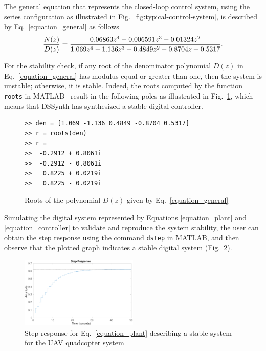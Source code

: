 \documentclass[10pt,conference]{IEEEtran}
\begin{document}
The general equation that represents the closed-loop control system, using
the series configuration as illustrated in
Fig.~\ref{fig:typical-control-system}, is described by
Eq.~\ref{equation_general} as follows
%
\begin{equation}
\small
\label{equation_general}
\frac{N(z)}{D(z)}=\frac{0.06863z^{4} - 0.006591z^{3} - 0.01324z^{2}}{1.069z^{4} - 1.136z^{3} + 0.4849z^{2} -0.8704z + 0.5317}.
\end{equation}
 
For the stability check, if any root of the denominator polynomial $D(z)$ in
Eq.~\ref{equation_general} has modulus equal or greater than one, then the
system is unstable; otherwise, it is stable.  Indeed, the roots computed by
the function \texttt{roots} in MATLAB~\cite{matlab-toolbox} result in the
following poles as illustrated in Fig.~\ref{roots-of-dz}, which means that
DSSynth has synthesized a stable digital controller.

\begin{figure}[ht]
\scriptsize
\begin{lstlisting}[xleftmargin=.025\textwidth,xrightmargin=.025\textwidth, frame=single, basicstyle=\tt]
>> den = [1.069 -1.136 0.4849 -0.8704 0.5317]
>> r = roots(den)
>> r =
>>  -0.2912 + 0.8061i
>>  -0.2912 - 0.8061i
>>   0.8225 + 0.0219i
>>   0.8225 - 0.0219i
\end{lstlisting}
\vspace{-0.2cm}
\caption{Roots of the polynomial $D(z)$ given by Eq.~\ref{equation_general}}
\label{roots-of-dz}
\end{figure}

Simulating the digital system represented by Equations
\eqref{equation_plant} and \eqref{equation_controller} to validate and
reproduce the system stability, the user can obtain the step response using
the command \texttt{dstep} in MATLAB, and then observe that the plotted
graph indicates a stable digital system (Fig.~\ref{step-response}).

\begin{figure}[ht]
  \includegraphics[width=0.5\textwidth]{step-response.eps}
  \caption{Step response for Eq.~\eqref{equation_plant} describing a stable system for the UAV quadcopter system}
  \label{step-response}
\end{figure}
\end{document}
